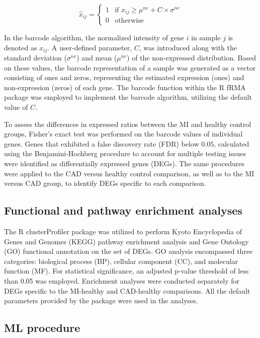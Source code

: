 \documentclass[sn-mathphys,Numbered]{sn-jnl}%
\theoremstyle{thmstyleone}%
\theoremstyle{thmstyletwo}%
\theoremstyle{thmstylethree}%
\begin{document}
\begin{equation}
\hat{x}_{ij} =
\begin{cases}
1 & \text{if } x_{ij} \geq \mu^{ne} + C \times \sigma^{ne} \\
0 & \text{otherwise}
\end{cases}
\end{equation}

In the barcode algorithm, the normalized intensity of gene $i$ in
sample $j$ is denoted as $x_{ij}$. A user-defined parameter, $C$,
was introduced along with the standard deviation ($\sigma^{ne}$) and
mean ($\mu^{ne}$) of the non-expressed distribution. Based on these
values, the barcode representation of a sample was generated as a vector
consisting of ones and zeros, representing the estimated expression
(ones) and non-expression (zeros) of each gene. The barcode function
within the R fRMA package was employed to implement the barcode
algorithm, utilizing the default value of $C$.

To assess the differences in expressed ratios between the MI and healthy
control groups, Fisher's exact test was performed on the barcode values
of individual genes. Genes that exhibited a false discovery rate (FDR)
below $0.05$, calculated using the Benjamini-Hochberg procedure to
account for multiple testing issues were identified as differentially
expressed genes (DEGs). The same procedures were applied to the CAD
versus healthy control comparison, as well as to the MI versus CAD
group, to identify DEGs specific to each comparison.


\subsection{Functional and pathway enrichment
analyses}\label{functional-and-pathway-enrichment-analyses}

The R clusterProfiler package \cite{cluster} was utilized to perform
Kyoto Encyclopedia of Genes and Genomes (KEGG) pathway enrichment
analysis and Gene Ontology (GO) functional annotation on the set of
DEGs. GO analysis encompassed three categories: biological process (BP),
cellular component (CC), and molecular function (MF). For statistical
significance, an adjusted p-value threshold of less than 0.05 was
employed. Enrichment analyses were conducted separately for DEGs
specific to the MI-healthy and CAD-healthy comparisons. All the default
parameters provided by the package were used in the analyses.


\subsection{ML procedure}\label{ml-procedure}
\end{document}
